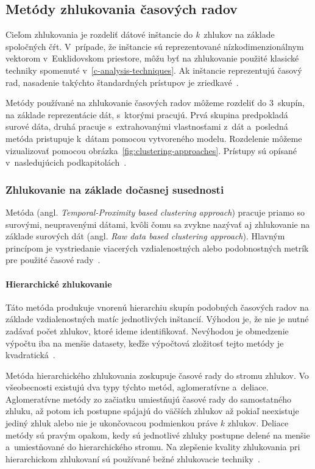\documentclass[a4paper,twoside,slovak,12pt,appendix]{article}
\begin{document}
\subsection{Metódy zhlukovania časových radov}
Cieľom zhlukovania je rozdeliť dátové inštancie do \textit{k}~zhlukov na základe
spoločných čŕt. V~prípade, že inštancie sú reprezentované nízkodimenzionálnym
vektorom v~Euklidovskom priestore, môžu byť na zhlukovanie použité klasické
techniky spomenuté v~\ref{c-analysis-techniques}. Ak inštancie reprezentujú
časový rad, nasadenie takýchto štandardných prístupov je
zriedkavé~\cite{Hautamaki2008}.

Metódy používané na zhlukovanie časových radov môžeme rozdeliť do 3~skupín, na
základe reprezentácie dát, s~ktorými pracujú. Prvá skupina predpokladá surové
dáta, druhá pracuje s~extrahovanými vlastnosťami z~dát a~posledná metóda
pristupuje k~dátam pomocou vytvoreného modelu. Rozdelenie môžeme vizualizovať
pomocou obrázka~\ref{fig:clustering-approaches}. Prístupy sú opísané
v~nasledujúcich podkapitolách~\cite{Rani2012}.

\subsubsection{Zhlukovanie na základe dočasnej susednosti}
Metóda (angl. \textit{Temporal-Proximity based clustering approach}) pracuje
priamo so surovými, neupravenými dátami, kvôli čomu sa zvykne nazývať aj
zhlukovanie na základe surových dát (angl. \textit{Raw data based clustering
approach}). Hlavným princípom je vystriedanie viacerých vzdialenostných alebo
podobnostných metrík pre použité časové rady~\cite{Rani2012}.

\paragraph{Hierarchické zhlukovanie}
\label{c:hierarchical-clustering}
Táto metóda produkuje vnorenú hierarchiu skupín podobných časových radov na
základe vzdialenostných matíc jednotlivých inštancií. Výhodou je, že nie je
nutné zadávať počet zhlukov, ktoré ideme identifikovať. Nevýhodou je obmedzenie
výpočtu iba na menšie datasety, keďže výpočtová zložitosť tejto metódy je
kvadratická~\cite{Dzeroski2007}.

Metóda hierarchického zhlukovania zoskupuje časové rady do stromu zhlukov. Vo
všeobecnosti existujú dva typy týchto metód, aglomeratívne a~deliace.
Aglomeratívne metódy zo začiatku umiestňujú časové rady do samostatného zhluku,
až potom ich postupne spájajú do väčších zhlukov až pokiaľ neexistuje jediný
zhluk alebo nie je ukončovacou podmienkou práve $k$ zhlukov. Deliace metódy sú
pravým opakom, kedy sú jednotlivé zhluky postupne delené na menšie
a~umiestňované do hierarchického stromu. Na zlepšenie kvality zhlukovania pri
hierarchickom zhlukovaní sú používané bežné zhlukovacie
techniky~\cite{WarrenLiao2005}.
\end{document}
